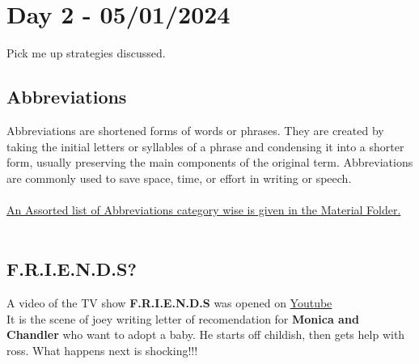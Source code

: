 \documentclass[a4paper,30pt]{report}
\begin{document}
  \chapter{Day 2 - 05/01/2024}
    Pick me up strategies discussed.

    \section{Abbreviations}
      Abbreviations are shortened forms of words or phrases. They are created by taking the initial letters or syllables of a phrase and condensing it into a shorter form, usually preserving the main components of the original term. Abbreviations are commonly used to save space, time, or effort in writing or speech.\\\\
      
     \underline{An Assorted list of Abbreviations category wise is given in the Material Folder.}\\\\
    
    \section{F.R.I.E.N.D.S?}
      A video of the TV show \textbf{F.R.I.E.N.D.S} was opened on \href{https://youtube.com}{Youtube}\\
      It is the scene of joey writing letter of recomendation for \textbf{Monica and Chandler} who want to adopt a baby. He starts off childish, then gets help with ross. What happens next is shocking!!!\\\\
      
\end{document}
